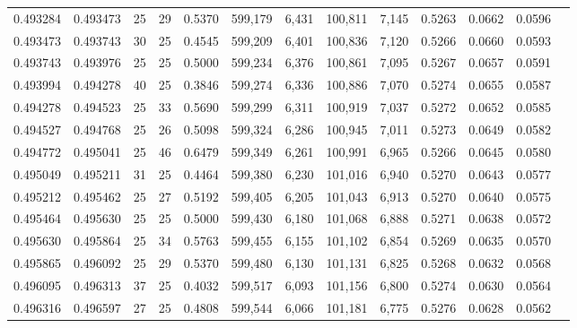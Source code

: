 \begin{tabular}{rrrrrrrrrrrrr}
0.493284 & 0.493473 &    25 &  29 &                                     0.5370 & 599,179 &   6,431 & 100,811 &   7,145 & 0.5263 & 0.0662 & 0.0596 \\
0.493473 & 0.493743 &    30 &  25 &                                     0.4545 & 599,209 &   6,401 & 100,836 &   7,120 & 0.5266 & 0.0660 & 0.0593 \\
0.493743 & 0.493976 &    25 &  25 &                                     0.5000 & 599,234 &   6,376 & 100,861 &   7,095 & 0.5267 & 0.0657 & 0.0591 \\
0.493994 & 0.494278 &    40 &  25 &                                     0.3846 & 599,274 &   6,336 & 100,886 &   7,070 & 0.5274 & 0.0655 & 0.0587 \\
0.494278 & 0.494523 &    25 &  33 &                                     0.5690 & 599,299 &   6,311 & 100,919 &   7,037 & 0.5272 & 0.0652 & 0.0585 \\
0.494527 & 0.494768 &    25 &  26 &                                     0.5098 & 599,324 &   6,286 & 100,945 &   7,011 & 0.5273 & 0.0649 & 0.0582 \\
0.494772 & 0.495041 &    25 &  46 &                                     0.6479 & 599,349 &   6,261 & 100,991 &   6,965 & 0.5266 & 0.0645 & 0.0580 \\
0.495049 & 0.495211 &    31 &  25 &                                     0.4464 & 599,380 &   6,230 & 101,016 &   6,940 & 0.5270 & 0.0643 & 0.0577 \\
0.495212 & 0.495462 &    25 &  27 &                                     0.5192 & 599,405 &   6,205 & 101,043 &   6,913 & 0.5270 & 0.0640 & 0.0575 \\
0.495464 & 0.495630 &    25 &  25 &                                     0.5000 & 599,430 &   6,180 & 101,068 &   6,888 & 0.5271 & 0.0638 & 0.0572 \\
0.495630 & 0.495864 &    25 &  34 &                                     0.5763 & 599,455 &   6,155 & 101,102 &   6,854 & 0.5269 & 0.0635 & 0.0570 \\
0.495865 & 0.496092 &    25 &  29 &                                     0.5370 & 599,480 &   6,130 & 101,131 &   6,825 & 0.5268 & 0.0632 & 0.0568 \\
0.496095 & 0.496313 &    37 &  25 &                                     0.4032 & 599,517 &   6,093 & 101,156 &   6,800 & 0.5274 & 0.0630 & 0.0564 \\
0.496316 & 0.496597 &    27 &  25 &                                     0.4808 & 599,544 &   6,066 & 101,181 &   6,775 & 0.5276 & 0.0628 & 0.0562 \\

\end{tabular}
